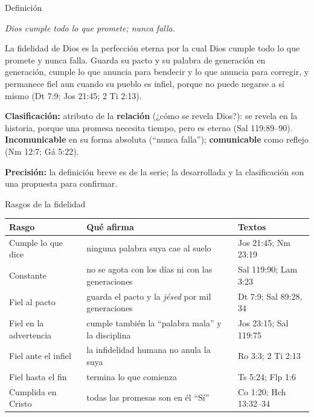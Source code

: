 \documentclass[hyperref={bookmarks=false},aspectratio=169]{beamer}
\newcommand{\destacar}[1]{\textbf{\textcolor{azul}{#1}}}
\newcommand{\precision}[1]{{\footnotesize\color{gris}\textbf{Precisión:} #1}}
\begin{document}
\begin{frame}{Definición}
\begin{tcolorbox}[colback=papiro,colframe=dorado,boxrule=1.2pt,arc=3pt]
\centering\itshape Dios cumple todo lo que promete; nunca falla.
\end{tcolorbox}
\begin{tcolorbox}[colback=papiro,colframe=azul,boxrule=1pt,arc=3pt]
\small La fidelidad de Dios es la perfección eterna por la cual Dios cumple todo lo que promete y nunca falla. Guarda su pacto y su palabra de generación en generación, cumple lo que anuncia para bendecir y lo que anuncia para corregir, y permanece fiel aun cuando su pueblo es infiel, porque no puede negarse a sí mismo (Dt 7:9; Jos 21:45; 2 Ti 2:13).
\end{tcolorbox}
\scriptsize\textbf{Clasificación:} atributo de la \destacar{relación} (¿cómo se revela Dios?): se revela en la historia, porque una promesa necesita tiempo, pero es eterno (Sal 119:89--90). \destacar{Incomunicable} en su forma absoluta (``nunca falla''); \destacar{comunicable} como reflejo (Nm 12:7; Gá 5:22).\par
\precision{la definición breve es de la serie; la desarrollada y la clasificación son una propuesta para confirmar.}
\end{frame}

\begin{frame}{Rasgos de la fidelidad}
\scriptsize\renewcommand{\arraystretch}{1.18}
\begin{tabular}{@{}>{\RaggedRight\arraybackslash}p{3.0cm}>{\RaggedRight\arraybackslash}p{5.6cm}>{\RaggedRight\arraybackslash}p{3.4cm}@{}}
\toprule
\textbf{Rasgo} & \textbf{Qué afirma} & \textbf{Textos} \\ \midrule
Cumple lo que dice & ninguna palabra suya cae al suelo & Jos 21:45; Nm 23:19 \\
Constante & no se agota con los días ni con las generaciones & Sal 119:90; Lam 3:23 \\
Fiel al pacto & guarda el pacto y la \emph{jésed} por mil generaciones & Dt 7:9; Sal 89:28, 34 \\
Fiel en la advertencia & cumple también la ``palabra mala'' y la disciplina & Jos 23:15; Sal 119:75 \\
Fiel ante el infiel & la infidelidad humana no anula la suya & Ro 3:3; 2 Ti 2:13 \\
Fiel hasta el fin & termina lo que comienza & 1 Ts 5:24; Flp 1:6 \\
Cumplida en Cristo & todas las promesas son en él ``Sí'' & 2 Co 1:20; Hch 13:32--34 \\
\bottomrule
\end{tabular}
\end{frame}
\end{document}
